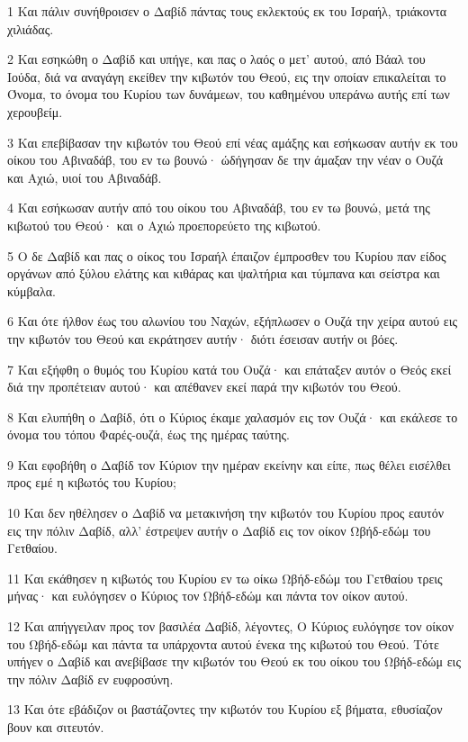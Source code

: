 \par 1 Και πάλιν συνήθροισεν ο Δαβίδ πάντας τους εκλεκτούς εκ του Ισραήλ, τριάκοντα χιλιάδας.
\par 2 Και εσηκώθη ο Δαβίδ και υπήγε, και πας ο λαός ο μετ' αυτού, από Βάαλ του Ιούδα, διά να αναγάγη εκείθεν την κιβωτόν του Θεού, εις την οποίαν επικαλείται το Όνομα, το όνομα του Κυρίου των δυνάμεων, του καθημένου υπεράνω αυτής επί των χερουβείμ.
\par 3 Και επεβίβασαν την κιβωτόν του Θεού επί νέας αμάξης και εσήκωσαν αυτήν εκ του οίκου του Αβιναδάβ, του εν τω βουνώ· ώδήγησαν δε την άμαξαν την νέαν ο Ουζά και Αχιώ, υιοί του Αβιναδάβ.
\par 4 Και εσήκωσαν αυτήν από του οίκου του Αβιναδάβ, του εν τω βουνώ, μετά της κιβωτού του Θεού· και ο Αχιώ προεπορεύετο της κιβωτού.
\par 5 Ο δε Δαβίδ και πας ο οίκος του Ισραήλ έπαιζον έμπροσθεν του Κυρίου παν είδος οργάνων από ξύλου ελάτης και κιθάρας και ψαλτήρια και τύμπανα και σείστρα και κύμβαλα.
\par 6 Και ότε ήλθον έως του αλωνίου του Ναχών, εξήπλωσεν ο Ουζά την χείρα αυτού εις την κιβωτόν του Θεού και εκράτησεν αυτήν· διότι έσεισαν αυτήν οι βόες.
\par 7 Και εξήφθη ο θυμός του Κυρίου κατά του Ουζά· και επάταξεν αυτόν ο Θεός εκεί διά την προπέτειαν αυτού· και απέθανεν εκεί παρά την κιβωτόν του Θεού.
\par 8 Και ελυπήθη ο Δαβίδ, ότι ο Κύριος έκαμε χαλασμόν εις τον Ουζά· και εκάλεσε το όνομα του τόπου Φαρές-ουζά, έως της ημέρας ταύτης.
\par 9 Και εφοβήθη ο Δαβίδ τον Κύριον την ημέραν εκείνην και είπε, πως θέλει εισέλθει προς εμέ η κιβωτός του Κυρίου;
\par 10 Και δεν ηθέλησεν ο Δαβίδ να μετακινήση την κιβωτόν του Κυρίου προς εαυτόν εις την πόλιν Δαβίδ, αλλ' έστρεψεν αυτήν ο Δαβίδ εις τον οίκον Ωβήδ-εδώμ του Γετθαίου.
\par 11 Και εκάθησεν η κιβωτός του Κυρίου εν τω οίκω Ωβήδ-εδώμ του Γετθαίου τρεις μήνας· και ευλόγησεν ο Κύριος τον Ωβήδ-εδώμ και πάντα τον οίκον αυτού.
\par 12 Και απήγγειλαν προς τον βασιλέα Δαβίδ, λέγοντες, Ο Κύριος ευλόγησε τον οίκον του Ωβήδ-εδώμ και πάντα τα υπάρχοντα αυτού ένεκα της κιβωτού του Θεού. Τότε υπήγεν ο Δαβίδ και ανεβίβασε την κιβωτόν του Θεού εκ του οίκου του Ωβήδ-εδώμ εις την πόλιν Δαβίδ εν ευφροσύνη.
\par 13 Και ότε εβάδιζον οι βαστάζοντες την κιβωτόν του Κυρίου εξ βήματα, εθυσίαζον βουν και σιτευτόν.

